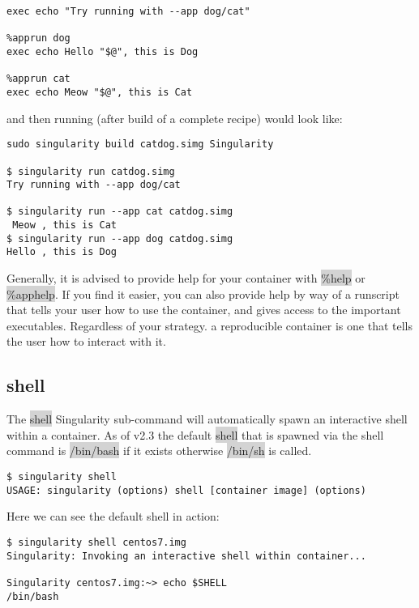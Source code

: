 \documentclass[a4paper]{article}
\begin{document}
\begin{lstlisting}[frame=single]
%runscript
exec echo "Try running with --app dog/cat"

%apprun dog
exec echo Hello "$@", this is Dog

%apprun cat
exec echo Meow "$@", this is Cat
\end{lstlisting}

and then running (after build of a complete recipe) would look like:
\begin{lstlisting}[frame=single]
sudo singularity build catdog.simg Singularity 

$ singularity run catdog.simg 
Try running with --app dog/cat

$ singularity run --app cat catdog.simg
 Meow , this is Cat
$ singularity run --app dog catdog.simg  
Hello , this is Dog
\end{lstlisting}

Generally, it is advised to provide help for your container with \colorbox{lightgray}{\%help} or \colorbox{lightgray}{\%apphelp}. If you find it easier, you can also provide help by way of a runscript that tells your user how to use the container, and gives access to the important executables. Regardless of your strategy. a reproducible container is one that tells the user how to interact with it.

\subsection{shell}
\label{sec:shell}

The  \colorbox{lightgray}{shell} Singularity sub-command will automatically spawn an interactive shell within a container. As of v2.3 the default  \colorbox{lightgray}{shell} that is spawned via the shell command is  \colorbox{lightgray}{/bin/bash} if it exists otherwise  \colorbox{lightgray}{/bin/sh} is called.
\begin{lstlisting}[frame=single]
$ singularity shell
USAGE: singularity (options) shell [container image] (options)
\end{lstlisting}

Here we can see the default shell in action:
\begin{lstlisting}[frame=single]
$ singularity shell centos7.img
Singularity: Invoking an interactive shell within container...

Singularity centos7.img:~> echo $SHELL
/bin/bash
\end{lstlisting}
\end{document}
